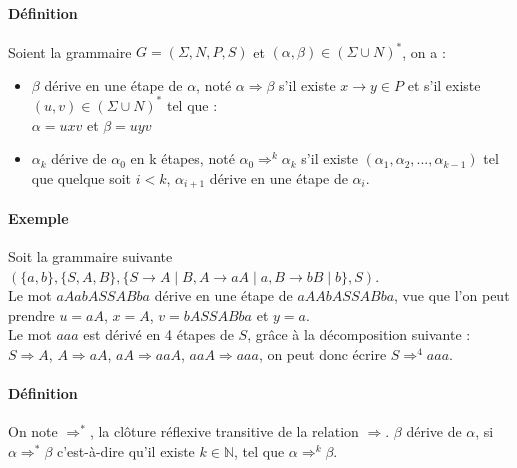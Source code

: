

\paragraph{Définition} %
\label{par:d_finition}

Soient la grammaire $G = (\Sigma,N,P,S)$ et $(\alpha,\beta) \in (\Sigma \cup N)^*$, on a :

\begin{itemize}
	\item $\beta$ dérive en une étape de $\alpha$, noté $\alpha \Rightarrow \beta$ s'il existe $x \rightarrow y \in P$ et s'il existe $(u,v) \in (\Sigma \cup N)^*$ tel que :\\
	$\alpha = uxv$ et $\beta = uyv$

	\item $\alpha_k$ dérive de $\alpha_0$ en k étapes, noté $\alpha_0 \Rightarrow^k \alpha_k$ s'il existe $(\alpha_1,\alpha_2,...,\alpha_{k-1})$ tel que quelque soit $i < k$, $\alpha_{i+1}$ dérive en une étape de $\alpha_i$.
\end{itemize}



\paragraph{Exemple} %
\label{par:exemple}

Soit la grammaire suivante $(\{a,b\},\{S,A,B\},\{S \rightarrow A \mid B, A\rightarrow aA \mid a, B \rightarrow bB\mid b\},S)$.\\
Le mot $aAabASSABba$ dérive en une étape de $aAAbASSABba$, vue que l'on peut prendre $u=aA$, $x=A$, $v=bASSABba$ et $y=a$.\\
Le mot $aaa$ est dérivé en 4 étapes de $S$, grâce à la décomposition suivante :\\
$S \Rightarrow A$, $A \Rightarrow aA$, $aA \Rightarrow aaA$, $aaA \Rightarrow aaa$, on peut donc écrire $S \Rightarrow^4 aaa$.



\paragraph{Définition} %
\label{par:d_finition}

On note $\Rightarrow^*$, la clôture réflexive transitive de la relation $\Rightarrow$. $\beta$ dérive de $\alpha$, si $\alpha \Rightarrow^* \beta$ c'est-à-dire qu'il existe $k \in \mathbb{N}$, tel que $\alpha \Rightarrow^k \beta$.

